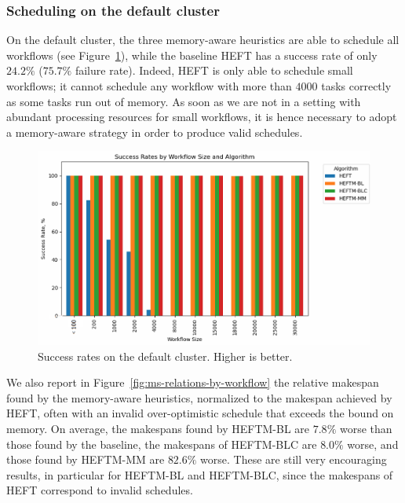 \documentclass[conference]{IEEEtran}
\newcommand{\algo}[1]{\textsc{#1}}
\newcommand{\heft}{\algo{HEFT}\xspace}
\newcommand{\heftmm}{\algo{HEFTM-MM}\xspace}
\newcommand{\heftbl}{\algo{HEFTM-BL}\xspace}
\newcommand{\heftblc}{\algo{HEFTM-BLC}\xspace}
\begin{document}
\subsubsection{Scheduling on the default cluster}
%
%
On the default cluster,  the three memory-aware heuristics are able to schedule all workflows
(see Figure~\ref{fig:success-rates-large}), while
the baseline \heft has a success rate of only $24.2\%$ ($75.7\%$ failure rate).
Indeed, \heft is only able to schedule small workflows; it cannot schedule any workflow 
with more than $4000$ tasks correctly as some tasks run out of memory. As soon as we are not in a setting
with abundant processing resources for small workflows, it is hence necessary to adopt
a memory-aware strategy in order to produce valid schedules.

\begin{figure}[tb]
  \centering
  \includegraphics[width=1.08\columnwidth] {images/success-rates-large2}
  \vspace{-0.8cm}
  \caption{Success rates on the default cluster. Higher is better.}
  \label{fig:success-rates-large}
  \vspace{-0.15cm}
\end{figure}

We also report in  Figure~\ref{fig:ms-relations-by-workflow} the relative makespan found
by the memory-aware heuristics, normalized to the
makespan achieved by \heft, often with an invalid over-optimistic schedule that exceeds
the bound on memory.
On average, the makespans found by \heftbl are $7.8\%$ worse than those found by the baseline,
the makespans of \heftblc are $8.0\%$
worse, and those found by \heftmm are $82.6\%$ worse. These are still very encouraging results,
in particular for \heftbl and \heftblc, since the makespans of \heft correspond to invalid schedules.
\end{document}
